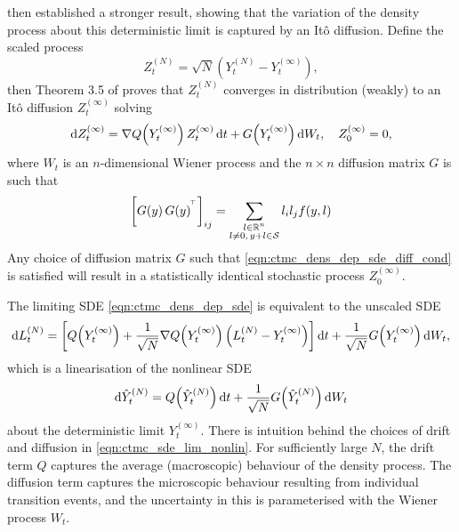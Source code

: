 \citet{Kurtz_1971_LimitTheoremsSequences} then established a stronger result, showing that the variation of the density process about this deterministic limit is captured by an It\^o diffusion.
Define the scaled process
\[
	Z_t^{(N)} = \sqrt{N}\left(Y_t^{(N)} - Y_{t}^{(\infty)}\right),
\]
then Theorem 3.5 of \citet{Kurtz_1971_LimitTheoremsSequences} proves that \(Z_t^{(N)}\) converges in distribution (weakly) to an It\^o diffusion \(Z_t^{(\infty)}\) solving
\begin{equation}
	\dif Z_t^{(\infty)} = \nabla Q\!\left(Y_t^{(\infty)}\right) Z_t^{(\infty)}\dif t + G\!\left(Y_t^{(\infty)}\right)\dif W_t, \quad Z_0^{(\infty)} = 0,
	\label{eqn:ctmc_dens_dep_sde}
\end{equation}
where \(W_t\) is an \(n\)-dimensional Wiener process and the \(n \times n\) diffusion matrix \(G\) is such that
\begin{equation}
	\left[G\!\left(y\right)G\!\left(y\right)^{^{\!\top}}\right]_{ij} = \sum_{\substack{l \in \mathbb{R}^n \\ l \neq 0,\, y + l \in \mathcal{S}}}{l_i l_j f\!\left(y,l\right)}
	\label{eqn:ctmc_dens_dep_sde_diff_cond}
\end{equation}
Any choice of diffusion matrix \(G\) such that \cref{eqn:ctmc_dens_dep_sde_diff_cond} is satisfied will result in a statistically identical stochastic process \(Z_0^{(\infty)}\).

The limiting SDE \cref{eqn:ctmc_dens_dep_sde} is equivalent to the unscaled SDE
\begin{equation}
	\dif L_t^{(N)} = \left[Q\!\left(Y_t^{(\infty)}\right) + \frac{1}{\sqrt{N}} \nabla Q\!\left(Y_t^{(\infty)}\right)\left(L_t^{(N)} - Y_t^{(\infty)}\right)\right]\dif t + \frac{1}{\sqrt{N}}G\!\left(Y_t^{(\infty)}\right)\dif W_t,
	\label{eqn:ctmc_sde_lin_lim}
\end{equation}
which is a linearisation of the nonlinear SDE
\begin{equation}
	\dif \hat{Y}^{(N)}_t = Q\!\left(\hat{Y}^{(N)}_t\right)\dif t + \frac{1}{\sqrt{N}}G\!\left(\hat{Y}_t^{(N)}\right)\dif W_t
	\label{eqn:ctmc_sde_lim_nonlin}
\end{equation}
about the deterministic limit \(Y_t^{(\infty)}\).
There is intuition behind the choices of drift and diffusion in \cref{eqn:ctmc_sde_lim_nonlin}.
For sufficiently large \(N\), the drift term \(Q\) captures the average (macroscopic) behaviour of the density process.
The diffusion term captures the microscopic behaviour resulting from individual transition events, and the uncertainty in this is parameterised with the Wiener process \(W_t\).





